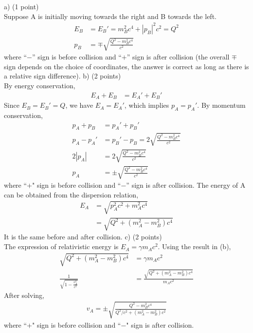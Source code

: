 \documentclass[12pt]{book} %
\numberwithin{equation}{chapter}
\def\c{\gamma}
\begin{document}
\begin{solbox}
a) (1 point)\\
Suppose A is initially moving towards the right and B towards the left.
\begin{align*}
E_{B}&=E_{B}'=m_{B}^{2}c^{4}+\left|p_{B}\right|^{2}c^{2}=Q^{2}\\
p_{B}&=\mp\sqrt{\frac{Q^{2}-m_{B}^{2}c^{4}}{c^{2}}}
\end{align*}
where ``$-$'' sign is before collision and ``$+$'' sign is after collision (the overall $\mp$ sign depends on the choice of coordinates, the answer is correct as long as there is a relative sign difference).\bigskip\newline
b) (2 points)\\
By energy conservation,
\begin{align*}
E_{A}+E_{B}&=E_{A}'+E_{B}'
\end{align*}
Since $E_{B}=E_{B}'=Q$, we have $E_{A}=E_{A}'$, which implies $p_{A}=p_{A}'$.\bigskip\newline
By momentum conservation,
\begin{align*}
p_{A}+p_{B}&=p_{A}'+p_{B}'\\
p_{A}-p_{A}'&=p_{B}'-p_{B}=2\sqrt{\frac{Q^{2}-m_{B}^{2}c^{4}}{c^{2}}}\\
2\left|p_{A}\right|&=2\sqrt{\frac{Q^{2}-m_{B}^{2}c^{4}}{c^{2}}}\\
p_{A}&=\pm\sqrt{\frac{Q^{2}-m_{B}^{2}c^{4}}{c^{2}}}
\end{align*}
where ``$+$" sign is before collision and ``$-$'' sign is after collision.\bigskip\newline
The energy of A can be obtained from the dispersion relation,
\begin{align*}
E_{A}&=\sqrt{p_{A}^{2}c^{2}+m_{A}^2 c^4}\\
&=\sqrt{Q^2+\left(m_{A}^{2}-m_{B}^{2}\right)c^4}
\end{align*}
It is the same before and after collision.\bigskip\newline
c) (2 points)\\
The expression of relativistic energy is $E_{A}=\c m_{A}c^2$. Using the result in (b),
\begin{align*}
\sqrt{Q^2+\left(m_{A}^{2}-m_{B}^{2}\right)c^4}&=\c m_{A}c^2\\
\frac{1}{\sqrt{1-\frac{v_{A}^2}{c^2}}}&=\frac{\sqrt{Q^2+\left(m_{A}^{2}-m_{B}^{2}\right)c^4}}{m_{A}c^2}
\end{align*}
After solving,
\begin{align*}
v_{A}=\pm\sqrt{\frac{Q^{2}-m_{B}^{2}c^{4}}{Q^{2}/c^{2}+\left(m_{A}^{2}-m_{B}^{2}\right)c^{2}}}
\end{align*}
where ``$+$" sign is before collision and ``$-$" sign is after collision.
\end{solbox}
\end{document}
